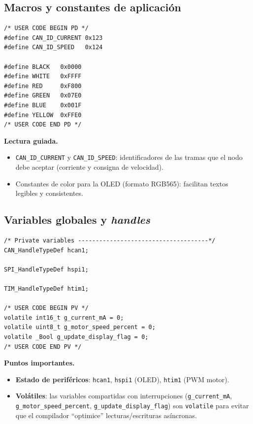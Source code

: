\documentclass[a4paper,12pt]{article}
\begin{document}
\subsection{Macros y constantes de aplicación}
\begin{lstlisting}
/* USER CODE BEGIN PD */
#define CAN_ID_CURRENT 0x123
#define CAN_ID_SPEED   0x124

#define BLACK   0x0000
#define WHITE   0xFFFF
#define RED     0xF800
#define GREEN   0x07E0
#define BLUE    0x001F
#define YELLOW  0xFFE0
/* USER CODE END PD */
\end{lstlisting}

\noindent\textbf{Lectura guiada.}
\begin{itemize}
  \item \texttt{CAN\_ID\_CURRENT} y \texttt{CAN\_ID\_SPEED}: identificadores de las tramas que el nodo debe aceptar (corriente y consigna de velocidad).
  \item Constantes de color para la OLED (formato RGB565): facilitan textos legibles y consistentes.
\end{itemize}

\subsection{Variables globales y \textit{handles}}
\begin{lstlisting}
/* Private variables -------------------------------------*/
CAN_HandleTypeDef hcan1;

SPI_HandleTypeDef hspi1;

TIM_HandleTypeDef htim1;

/* USER CODE BEGIN PV */
volatile int16_t g_current_mA = 0;
volatile uint8_t g_motor_speed_percent = 0;
volatile _Bool g_update_display_flag = 0;
/* USER CODE END PV */
\end{lstlisting}

\noindent\textbf{Puntos importantes.}
\begin{itemize}
  \item \textbf{Estado de periféricos}: \texttt{hcan1}, \texttt{hspi1} (OLED), \texttt{htim1} (PWM motor).
  \item \textbf{Volátiles}: las variables compartidas con interrupciones (\texttt{g\_current\_mA}, \texttt{g\_motor\_speed\_percent}, \texttt{g\_update\_display\_flag}) son \texttt{volatile} para evitar que el compilador “optimice” lecturas/escrituras asíncronas.
\end{itemize}
\end{document}
